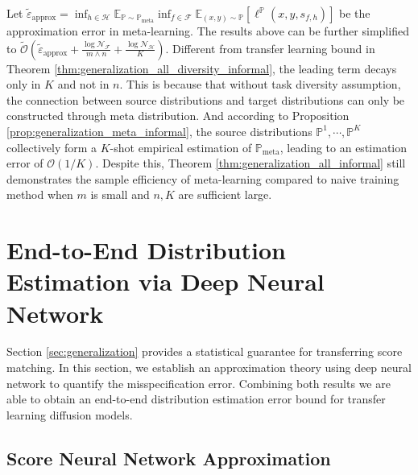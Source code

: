 \documentclass{article}
\numberwithin{equation}{section}
\newcommand{\E}{\mathbb{E}}
\theoremstyle{definition}
\newcommand{\Pmeta}{\mathbb{P}_{\text{meta}}}
\renewcommand{\P}{\mathbb{P}}
\begin{document}
Let $\widetilde{\varepsilon}_{\text{approx}}=\inf_{h\in\mathcal{H}} \E_{\P\sim\Pmeta} \inf_{f\in\mathcal{F}}\E_{(x,y)\sim\P} [\ell^\P (x,y,s_{f,h})]$ be the approximation error in meta-learning.
The results above can be further simplified to $\widetilde{\mathcal{O}}\left(\widetilde{\varepsilon}_{\text{approx}}+\frac{\log\mathcal{N}_\mathcal{F}}{m\wedge n}+\frac{\log\mathcal{N}_\mathcal{H}}{K}\right)$. Different from transfer learning bound in Theorem \ref{thm:generalization_all_diversity_informal}, the leading term decays only in $K$ and not in $n$.
This is because that without task diversity assumption, the connection between source distributions and target distributions can only be constructed through meta distribution. 
And according to Proposition \ref{prop:generalization_meta_informal}, the source distributions $\P^1,\cdots,\P^K$ collectively form a $K$-shot empirical estimation of $\Pmeta$, leading to an estimation error of $\mathcal{O}(1/K)$. Despite this, Theorem \ref{thm:generalization_all_informal} still demonstrates the sample efficiency of meta-learning compared to naive training method when $m$ is small and $n,K$ are sufficient large. 


\section{End-to-End Distribution Estimation via Deep Neural Network}\label{sec:dist_estimation}

Section \ref{sec:generalization} provides a statistical guarantee for transferring score matching.
In this section, we establish an approximation theory using deep neural network to quantify the misspecification error.
Combining both results we are able to obtain an end-to-end distribution estimation error bound for transfer learning diffusion models.

\subsection{Score Neural Network Approximation}
\end{document}
